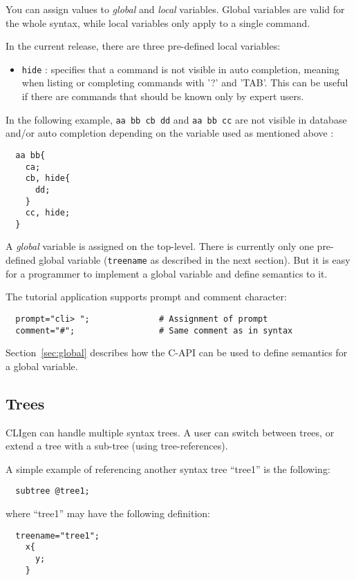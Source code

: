 \documentclass[a4paper, 10pt] {article}
\begin{document}
You can assign values to \emph{global} and \emph{local}
variables. Global variables are valid for the whole syntax, while
local variables only apply to a single command.

In the current release, there are three pre-defined local variables:
\begin{itemize}
\item
{\tt hide} : specifies that a command is not visible in auto completion, meaning when listing or completing commands with '?' and 'TAB'. This can be useful if there are commands that should be known only by expert users.
\end{itemize}

In the following example, {\tt aa bb cb dd} and {\tt aa bb cc} are not visible in database and/or auto completion
depending on the variable used as mentioned above :
\begin{verbatim}
  aa bb{
    ca;
    cb, hide{
      dd;
    }
    cc, hide;
  }
\end{verbatim}

A {\em global} variable is assigned on the top-level.  There is
currently only one pre-defined global variable ({\tt treename} as
described in the next section).  But it is easy for a programmer to
implement a global variable and define semantics to it. 

The tutorial application supports prompt and comment character:
\begin{verbatim}
  prompt="cli> ";              # Assignment of prompt
  comment="#";                 # Same comment as in syntax
\end{verbatim}
Section~\ref{sec:global} describes how the C-API can be used to define
semantics for a global variable.

\subsection{Trees}

CLIgen can handle multiple syntax trees. A user can switch between
trees, or extend a tree with a sub-tree (using tree-references).

A simple example of referencing another syntax tree ``tree1'' is the following:
\begin{verbatim}
  subtree @tree1;
\end{verbatim}

where ``tree1'' may have the following definition:
\begin{verbatim}
  treename="tree1";
    x{
      y;
    }
\end{verbatim}
\end{document}
